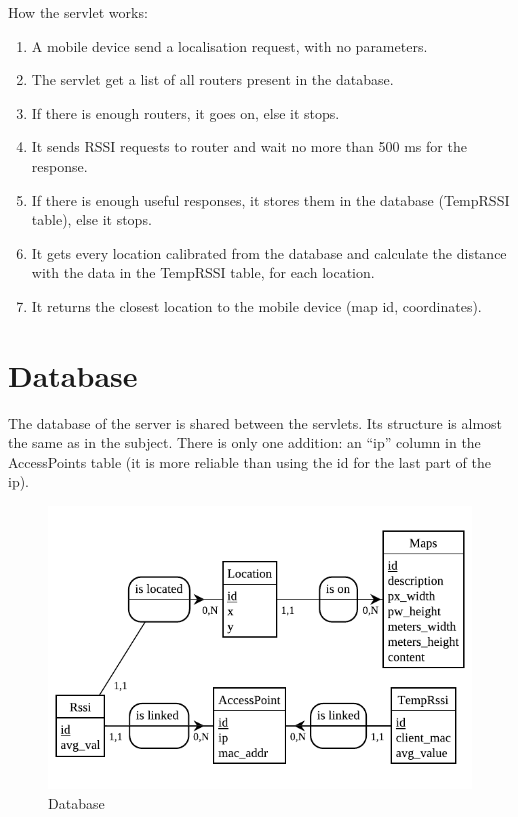 How the servlet works:
\begin{enumerate}
    \item A mobile device send a localisation request, with no parameters.
    \item The servlet get a list of all routers present in the database.
    \item If there is enough routers, it goes on, else it stops.
    \item It sends RSSI requests to router and wait no more than 500 ms for the
        response.
    \item If there is enough useful responses, it stores them in the database
        (TempRSSI table), else it stops.
    \item It gets every location calibrated from the database and calculate the
        distance with the data in the TempRSSI table, for each location.
    \item It returns the closest location to the mobile device (map id,
        coordinates).
\end{enumerate}


    \section{Database}

The database of the server is shared between the servlets. Its structure is
almost the same as in the subject. There is only one addition: an ``ip'' column
in the AccessPoints table (it is more reliable than using the id for the last
part of the ip).

\begin{figure}[h]
  \centering
  \includegraphics[scale=1]{./Positioning_server/db.pdf}
  \caption{Database}
\end{figure}

